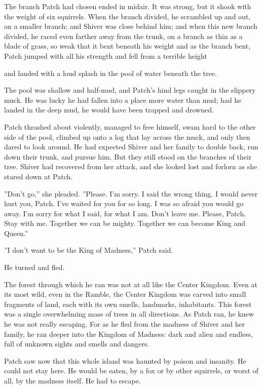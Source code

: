 \documentclass[12pt]{book}
\begin{document}
The branch Patch had chosen ended in midair. It was strong, but it shook with the weight of six squirrels. When the branch divided, he scrambled up and out, on a smaller branch; and Shiver was close behind him; and when this new branch divided, he raced even farther away from the trunk, on a branch as thin as a blade of grass, so weak that it bent beneath his weight %
and as the branch bent, Patch jumped with all his strength %
and fell from a terrible height %

and landed with a loud splash in the pool of water beneath the tree.

The pool was shallow and half-mud, and Patch's hind legs caught in the slippery muck. He was lucky he had fallen into a place more water than mud; had he landed in the deep mud, he would have been trapped and drowned.

Patch thrashed about violently, managed to free himself, swam hard to the other side of the pool, climbed up onto a log that lay across the muck, and only then dared to look around. He had expected Shiver and her family to double back, run down their trunk, and pursue him. But they still stood on the branches of their tree. Shiver had recovered from her attack, and she looked lost and forlorn as she stared down at Patch.

''Don't go,'' she pleaded. ''Please. I'm sorry. I said the wrong thing. I would never hurt you, Patch. I've waited for you for so long. I was so afraid you would go away. I'm sorry for what I said, for what I am. Don't leave me. Please, Patch. Stay with me. Together we can be mighty. Together we can become King and Queen.''

''I don't want to be the King of Madness,'' Patch said.

He turned and fled.

The forest through which he ran was not at all like the Center Kingdom. Even at its most wild, even in the Ramble, the Center Kingdom was carved into small fragments of land, each with its own smells, landmarks, inhabitants. This forest was a single overwhelming mass of trees in all directions. As Patch ran, he knew he was not really escaping. For as he fled from the madness of Shiver and her family, he ran deeper into the Kingdom of Madness: dark and alien and endless, full of unknown sights and smells and dangers.

Patch saw now that this whole island was haunted by poison and insanity. He could not stay here. He would be eaten, by a fox or by other squirrels, or worst of all, by the madness itself. He had to escape.
\end{document}
